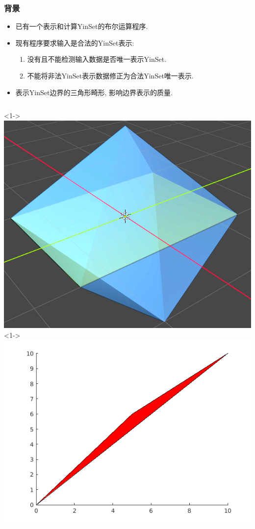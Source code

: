 \documentclass[UTF8]{ctexbeamer}	%
\theoremstyle{plain}
\theoremstyle{definition}
\theoremstyle{remark}
\numberwithin{equation}{section}
\begin{document}
\begin{frame}
    \frametitle{背景}
    \begin{itemize}
        \item 已有一个表示和计算YinSet的布尔运算程序.
        \item 现有程序要求输入是合法的YinSet表示:
              \begin{enumerate}
                  \item 没有且不能检测输入数据是否唯一表示YinSet.
                  \item 不能将非法YinSet表示数据修正为合法YinSet唯一表示.
              \end{enumerate}
        \item 表示YinSet边界的三角形畸形, 影响边界表示的质量.
    \end{itemize}
    \begin{columns}
        <1->
        \centering
        \includegraphics[width = .6\textwidth]{fig/wrong5em.png}
        <1->
        \centering
        \includegraphics[width = .6\textwidth]{fig/illTri.png}
    \end{columns}
\end{frame}
\end{document}
